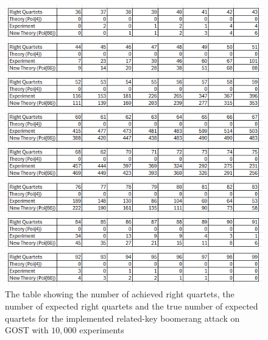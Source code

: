 \documentclass[10pt,journal,compsoc]{IEEEtran}
\begin{document}
\begin{appendices}
\begin{figure}[H]
    \centering
    \includegraphics[width=0.9\linewidth, keepaspectratio]{Figures/verBoomTableFull.png}
    \caption{The table showing the number of achieved right quartets, the number of expected right quartets and the true number of expected quartets for the implemented related-key boomerang attack on GOST with \(10,000\) experiments}
    \label{fig:verboomfull}
\end{figure}


\end{appendices}
\end{document}
